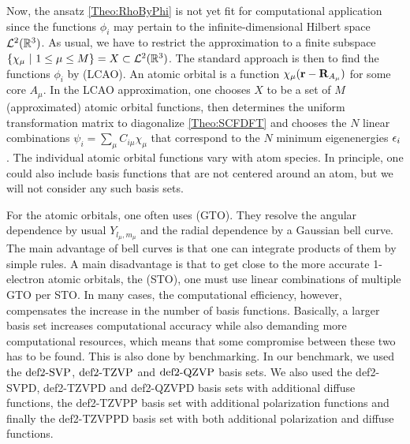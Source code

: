 Now, the ansatz \eqref{Theo:RhoByPhi} is not yet fit for computational application since the
functions $\phi_i$ may pertain to the infinite-dimensional Hilbert space $\mathcal L^2(\mathbb{R}^3)$.
As usual, we have to restrict the approximation to a finite subspace 
$\left\{{\chi_\mu\ |\ 1 \le \mu \le M} \right\} = X \subset \mathcal L^2(\mathbb{R}^3)$.
The standard approach is then to find the functions $\phi_i$ by  (LCAO). An atomic orbital is a function $\chi_\mu(\mathbf{r} - \mathbf{R}_{A_\mu})$
for some core $A_\mu$. In the LCAO approximation, one chooses $X$ to be a set of $M$ (approximated) atomic orbital
functions, then determines the uniform transformation matrix to diagonalize \eqref{Theo:SCFDFT}
and chooses the $N$ linear combinations $\psi_i=\sum_\mu C_{i \mu} \chi_\mu$ that correspond to the $N$ minimum
eigenenergies $\epsilon_i$. The individual atomic orbital functions vary with atom species. In principle,
one could also include basis functions that are not centered around an atom, but we will
not consider any such basis sets.

For the atomic orbitals, one often uses  (GTO). They resolve the
angular dependence by usual  $Y_{l_\mu,m_\mu}$ and the
radial dependence by a Gaussian bell curve. The main advantage of bell curves is that one can integrate products
of them by simple rules. A main disadvantage
is that to get close to the more accurate 1-electron atomic orbitals, the 
(STO), one must use linear combinations of multiple GTO per STO. In many cases, the computational
efficiency, however, compensates the increase in the number of basis functions.
Basically, a larger basis set increases computational accuracy while also demanding more
computational resources, which means that some compromise between these two has to
be found. This is also done by benchmarking. In our benchmark, we used the
$\text{def2-SVP}$,\cite{SchaeferHornAhlrichs1992}
$\text{def2-TZVP}$\cite{WeigendHaeserPatzeltEtAl1998} and
$\text{def2-QZVP}$\cite{WeigendFurcheAhlrichs2003} basis sets. We also used the def2-SVPD,
def2-TZVPD and def2-QZVPD basis sets with additional diffuse
functions,\cite{RappoportFurche2010} the
def2-TZVPP\cite{WeigendHaeserPatzeltEtAl1998} basis set with additional
polarization functions and finally the def2-TZVPPD\cite{RappoportFurche2010}
basis set with both additional polarization and diffuse functions.

